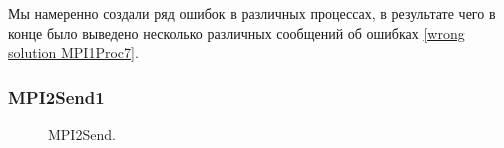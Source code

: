 Мы намеренно создали ряд ошибок в различных процессах, в результате чего в конце было выведено несколько различных сообщений об ошибках \ref{wrong solution MPI1Proc7}.

\newpage

\subsubsection{MPI2Send1}

\begin{figure}[htbp]%
    \centering
    \hfill%
    \caption{MPI2Send.}%
    \label{mpi2send}%
\end{figure}


